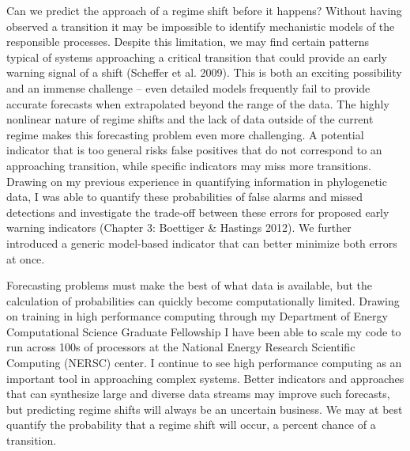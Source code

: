 Can we predict the approach of a regime shift before it happens?  Without having observed a transition it may be impossible to identify mechanistic models of the responsible processes.  Despite this limitation, we may find certain patterns typical of systems approaching a critical transition that could provide an early warning signal of a shift (Scheffer et al. 2009).  This is both an exciting possibility and an immense challenge – even detailed models frequently fail to provide accurate forecasts when extrapolated beyond the range of the data.  The highly nonlinear nature of regime shifts and the lack of data outside of the current regime makes this forecasting problem even more challenging.  A potential indicator that is too general risks false positives that do not correspond to an approaching transition, while specific indicators may miss more transitions.  Drawing on my previous experience in quantifying information in phylogenetic data, I was able to quantify these probabilities of false alarms and missed detections and investigate the trade-off between these errors for proposed early warning indicators (Chapter 3: Boettiger \& Hastings 2012).  We further introduced a generic model-based indicator that can better minimize both errors at once.  


Forecasting problems must make the best of what data is available, but the calculation of probabilities can quickly become computationally limited.  Drawing on training in high performance computing through my Department of Energy Computational Science Graduate Fellowship I have been able to scale my code to run across 100s of processors at the National Energy Research Scientific Computing (NERSC) center.  I continue to see high performance computing as an important tool in approaching complex systems. Better indicators and approaches that can synthesize large and diverse data streams may improve such forecasts, but predicting regime shifts will always be an uncertain business. We may at best quantify the probability that a regime shift will occur, a percent chance of a transition.  



